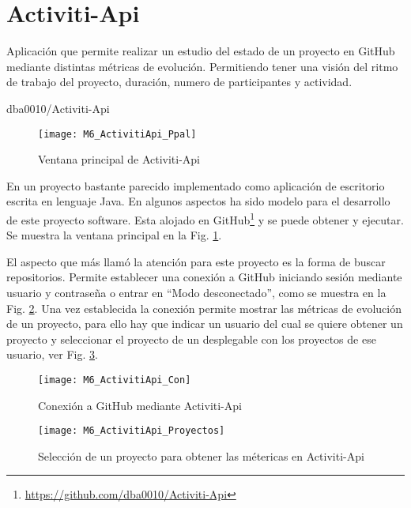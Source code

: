 
\section{Activiti-Api}

\epigraph{Aplicación que permite realizar un estudio del estado de un proyecto en GitHub mediante distintas métricas de evolución. Permitiendo tener una visión del ritmo de trabajo del proyecto, duración, numero de participantes y actividad.}{dba0010/Activiti-Api}

\begin{figure}[!h]
	\centering
	\texttt{[image: M6\_ActivitiApi\_Ppal]}
	\caption{Ventana principal de Activiti-Api}\label{fig:M6_ActivitiApi_Ppal}
\end{figure}

En un proyecto bastante parecido implementado como aplicación de escritorio escrita en lenguaje Java. En algunos aspectos ha sido modelo para el desarrollo de este proyecto software. Esta alojado en GitHub\footnote{\url{https://github.com/dba0010/Activiti-Api}} y se puede obtener y ejecutar. Se muestra la ventana principal en la Fig. \ref{fig:M6_ActivitiApi_Ppal}.

El aspecto que más llamó la atención para este proyecto es la forma de buscar repositorios. Permite establecer una conexión a GitHub iniciando sesión mediante usuario y contraseña o entrar en ``Modo desconectado'', como se muestra en la Fig. \ref{fig:M6_ActivitiApi_Con}. Una vez establecida la conexión permite mostrar las métricas de evolución de un proyecto, para ello hay que indicar un usuario del cual se quiere obtener un proyecto y seleccionar el proyecto de un desplegable con los proyectos de ese usuario, ver Fig. \ref{fig:M6_ActivitiApi_Proyectos}.

\begin{figure}[!h]
	\centering
	\texttt{[image: M6\_ActivitiApi\_Con]}
	\caption{Conexión a GitHub mediante Activiti-Api}\label{fig:M6_ActivitiApi_Con}
\end{figure}

\begin{figure}[!h]
	\centering
	\texttt{[image: M6\_ActivitiApi\_Proyectos]}
	\caption{Selección de un proyecto para obtener las métericas en Activiti-Api}\label{fig:M6_ActivitiApi_Proyectos}
\end{figure}

